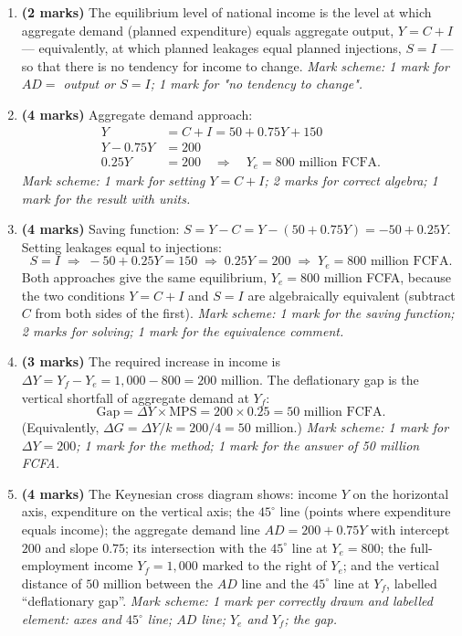 \documentclass[11pt]{article}
\begin{document}
\begin{corrige}
\begin{enumerate}
\item \textbf{(2 marks)} The equilibrium level of national income is the level at which aggregate demand (planned expenditure) equals aggregate output, $Y = C + I$ — equivalently, at which planned leakages equal planned injections, $S = I$ — so that there is no tendency for income to change. \emph{Mark scheme: 1 mark for $AD = $ output or $S = I$; 1 mark for "no tendency to change".}
\item \textbf{(4 marks)} Aggregate demand approach:
\begin{align*}
Y &= C + I = 50 + 0.75Y + 150 \\
Y - 0.75Y &= 200 \\
0.25Y &= 200 \quad\Rightarrow\quad Y_e = 800 \text{ million FCFA}.
\end{align*}
\emph{Mark scheme: 1 mark for setting $Y = C + I$; 2 marks for correct algebra; 1 mark for the result with units.}
\item \textbf{(4 marks)} Saving function: $S = Y - C = Y - (50 + 0.75Y) = -50 + 0.25Y$. Setting leakages equal to injections:
\[ S = I \;\Rightarrow\; -50 + 0.25Y = 150 \;\Rightarrow\; 0.25Y = 200 \;\Rightarrow\; Y_e = 800 \text{ million FCFA}. \]
Both approaches give the same equilibrium, $Y_e = 800$ million FCFA, because the two conditions $Y = C + I$ and $S = I$ are algebraically equivalent (subtract $C$ from both sides of the first). \emph{Mark scheme: 1 mark for the saving function; 2 marks for solving; 1 mark for the equivalence comment.}
\item \textbf{(3 marks)} The required increase in income is $\Delta Y = Y_f - Y_e = 1{,}000 - 800 = 200$ million. The deflationary gap is the vertical shortfall of aggregate demand at $Y_f$:
\[ \text{Gap} = \Delta Y \times \text{MPS} = 200 \times 0.25 = 50 \text{ million FCFA}. \]
(Equivalently, $\Delta G = \Delta Y / k = 200/4 = 50$ million.) \emph{Mark scheme: 1 mark for $\Delta Y = 200$; 1 mark for the method; 1 mark for the answer of 50 million FCFA.}
\item \textbf{(4 marks)} The Keynesian cross diagram shows: income $Y$ on the horizontal axis, expenditure on the vertical axis; the $45^{\circ}$ line (points where expenditure equals income); the aggregate demand line $AD = 200 + 0.75Y$ with intercept $200$ and slope $0.75$; its intersection with the $45^{\circ}$ line at $Y_e = 800$; the full-employment income $Y_f = 1{,}000$ marked to the right of $Y_e$; and the vertical distance of $50$ million between the $AD$ line and the $45^{\circ}$ line at $Y_f$, labelled ``deflationary gap''. \emph{Mark scheme: 1 mark per correctly drawn and labelled element: axes and $45^{\circ}$ line; $AD$ line; $Y_e$ and $Y_f$; the gap.}

\end{enumerate}
\end{corrige}
\end{document}
